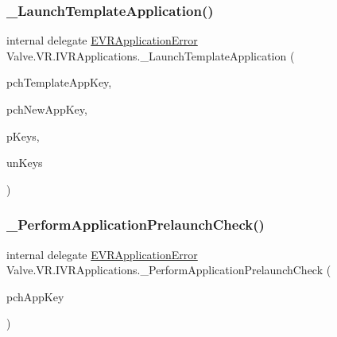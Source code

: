 \subsubsection{\texorpdfstring{\_LaunchTemplateApplication()}{\_LaunchTemplateApplication()}}
{\footnotesize\ttfamily internal delegate \mbox{\hyperlink{namespace_valve_1_1_v_r_a3488adab8a219b579fcee50f4e63a8b6}{E\+V\+R\+Application\+Error}} Valve.\+V\+R.\+I\+V\+R\+Applications.\+\_\+\+Launch\+Template\+Application (\begin{DoxyParamCaption}\item[{string}]{pch\+Template\+App\+Key,  }\item[{string}]{pch\+New\+App\+Key,  }\item[{\mbox{[}\+In, Out\mbox{]} \mbox{\hyperlink{struct_valve_1_1_v_r_1_1_app_override_keys__t}{App\+Override\+Keys\+\_\+t}} \mbox{[}$\,$\mbox{]}}]{p\+Keys,  }\item[{uint}]{un\+Keys }\end{DoxyParamCaption})}

\mbox{\label{struct_valve_1_1_v_r_1_1_i_v_r_applications_af8f1a196897ce93933338eca85476b37}} 
\subsubsection{\texorpdfstring{\_PerformApplicationPrelaunchCheck()}{\_PerformApplicationPrelaunchCheck()}}
{\footnotesize\ttfamily internal delegate \mbox{\hyperlink{namespace_valve_1_1_v_r_a3488adab8a219b579fcee50f4e63a8b6}{E\+V\+R\+Application\+Error}} Valve.\+V\+R.\+I\+V\+R\+Applications.\+\_\+\+Perform\+Application\+Prelaunch\+Check (\begin{DoxyParamCaption}\item[{string}]{pch\+App\+Key }\end{DoxyParamCaption})}

\mbox{\label{struct_valve_1_1_v_r_1_1_i_v_r_applications_af57c8e14b228aa90c1de06e488d188e1}} 
